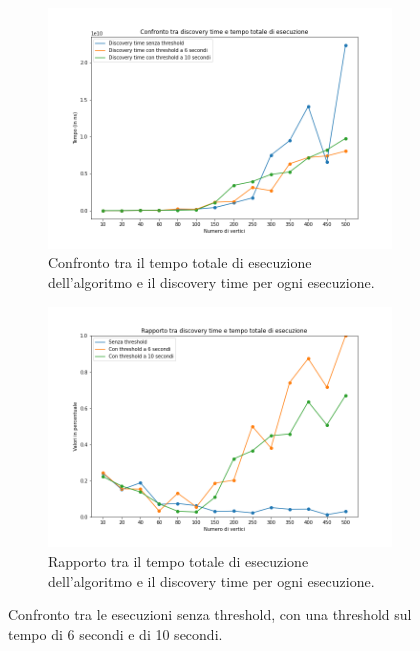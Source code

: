 \begin{figure}[H]
	\begin{subfigure}{.5\textwidth}
	  \centering
	  \includegraphics[width=1\textwidth]{res/images/single/karger-stein/discovery-time/confronto/karger_stein_confronto_discovery_time_total_time_with_thresholds.png}
	  \caption{Confronto tra il tempo totale di esecuzione dell'algoritmo e il discovery time per ogni esecuzione.}
	  \label{fig:confronto}
	\end{subfigure}
	\begin{subfigure}{.5\textwidth}
	  \centering
	  \includegraphics[width=1\textwidth]{res/images/single/karger-stein/discovery-time/confronto/karger_stein_rapporto_discovery_time_total_time_with_thresholds.png}
	  \caption{Rapporto tra il tempo totale di esecuzione dell'algoritmo e il 
	  discovery time per ogni esecuzione.}
	  \label{fig:rapporto}
	\end{subfigure}
	\caption{Confronto tra le esecuzioni senza threshold, con una threshold sul tempo 
	di 6 secondi e di 10 secondi.}
	\label{fig:karger_stein_discovery_time_thresholds}
\end{figure}

